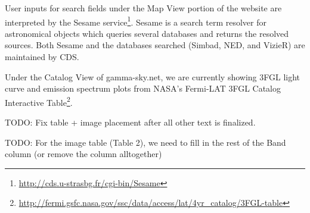     User inputs for search fields under the Map View portion of the website are interpreted by the Sesame service\footnote[3]{\url{http://cds.u-strasbg.fr/cgi-bin/Sesame}}. Sesame is a search term resolver for astronomical objects which queries several databases and returns the resolved sources. Both Sesame and the databases searched (Simbad, NED, and VizieR) are maintained by CDS.

    Under the Catalog View of gamma-sky.net, we are currently showing 3FGL light curve and emission spectrum plots from NASA's Fermi-LAT 3FGL Catalog Interactive Table\footnote[4]{\url{http://fermi.gsfc.nasa.gov/ssc/data/access/lat/4yr_catalog/3FGL-table}}.


    TODO: Fix table + image placement after all other text is finalized.


    TODO: For the image table (Table 2), we need to fill in the rest of the Band column (or remove the column alltogether)
